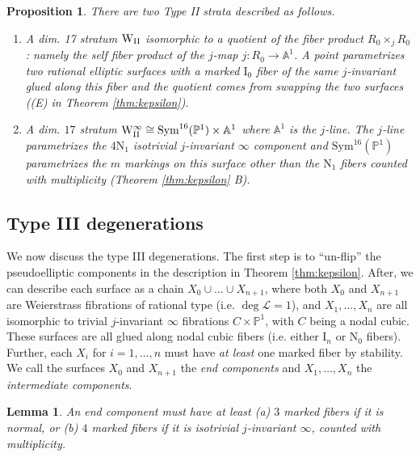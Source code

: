 \documentclass[11pt]{amsart}
\newtheorem{lemma}[theorem]{Lemma}
\newtheorem{prop}[theorem]{Proposition}
\theoremstyle{definition}
\theoremstyle{remark}
\newcounter{step}
\newcommand{\bP}{{\mathbb P}}
\newcommand{\Sym}{\mathrm{Sym}}
\newcommand{\mb}[1]{\mathbb{#1}}
\begin{document}
	\begin{prop}\label{prop:type2} There are two Type II strata described as follows. 
		
		\begin{enumerate}
			
			\item A dim. 17 stratum $\rm{W}_{II}$ isomorphic to a quotient of the fiber product $R_0 \times_j R_0$: namely the self fiber product of the $j$-map $j : R_0 \to \mb{A}^1$. A point parametrizes two rational elliptic surfaces with a marked $\mathrm{I}_0$ fiber of the same $j$-invariant glued along this fiber and the quotient comes from swapping the two surfaces ((E) in Theorem \ref{thm:kepsilon}). 
			
			\item A dim. $17$ stratum $\rm{W}_{II}^\infty \cong \Sym^{16}(\mb{P}^1) \times \mb{A}^1$ where $\mb{A}^1$ is the $j$-line. The $j$-line parametrizes the $4\mathrm{N}_1$ isotrivial $j$-invariant $\infty$ component and $\Sym^{16}(\mb{P}^1)$ parametrizes the $m$ markings on this surface other than the $\mathrm{N}_1$ fibers counted with multiplicity (Theorem \ref{thm:kepsilon} B).
			
		\end{enumerate}
		
	\end{prop} 
	
	
	\subsection{Type III degenerations}
	We now discuss the type III degenerations. The first step is to ``un-flip'' the pseudoelliptic components in the description in Theorem \ref{thm:kepsilon}. After, we can describe each surface as a chain $X_0 \cup \ldots \cup X_{n+1}$, where both $X_0$ and $X_{n+1}$ are Weierstrass fibrations of rational type (i.e. $\deg \mathscr{L} = 1$), and $X_1, \ldots, X_n$ are all isomorphic to trivial $j$-invariant $\infty$ fibrations $C \times \bP^1$, with $C$ being a nodal cubic. These surfaces are all glued along nodal cubic fibers (i.e. either $\mathrm{I}_n$ or $\mathrm{N}_0$ fibers). Further, each $X_i$ for $i = 1, \ldots, n$ must have \emph{at least} one marked fiber by stability.  We call the surfaces $X_0$ and $X_{n+1}$ the \emph{end components} and $X_1, \ldots, X_n$ the \emph{intermediate components}. 
	
	\begin{lemma}\label{lem:endmarkings} An end component must have at least (a) $3$ marked fibers if it is normal, or (b) $4$ marked fibers if it is isotrivial $j$-invariant $\infty$, counted with multiplicity. \end{lemma} 
	
\end{document}
